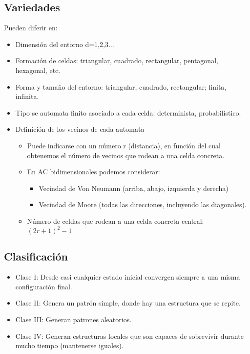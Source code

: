 \subsection{Variedades}
Pueden diferir en:
\begin{itemize}
    \item Dimensión del entorno d=1,2,3...
    \item Formación de celdas: triangular, cuadrado, rectangular, pentagonal, hexagonal, etc.
    \item Forma y tamaño del entorno: triangular, cuadrado, rectangular; finita, infinita.
    \item Tipo se automata finito asociado a cada celda: determinista, probabilístico.
    \item Definición de los vecinos de cada automata
    \begin{itemize}
        \item Puede indicarse con un número r (distancia), en función del cual obtenemos el número de vecinos que rodean a una celda concreta.
        \item En AC bidimensionales podemos considerar: 
        \begin{itemize}
            \item Vecindad de Von Neumann (arriba, abajo, izquierda y derecha)
            \item Vecindad de Moore (todas las direcciones, incluyendo las diagonales).
        \end{itemize} 
        \item Número de celdas que rodean a una celda concreta central: $(2r+1)^2-1$
    \end{itemize}
\end{itemize}

\subsection{Clasificación}
\begin{itemize}
    \item Clase I: Desde casi cualquier estado inicial convergen siempre a una misma configuración final.
    \item Clase II: Genera un patrón simple, donde hay una estructura que se repite.
    \item Clase III: Generan patrones aleatorios.
    \item Clase IV: Generan estructuras locales que son capaces de sobrevivir durante mucho tiempo (mantenerse iguales).
\end{itemize}

